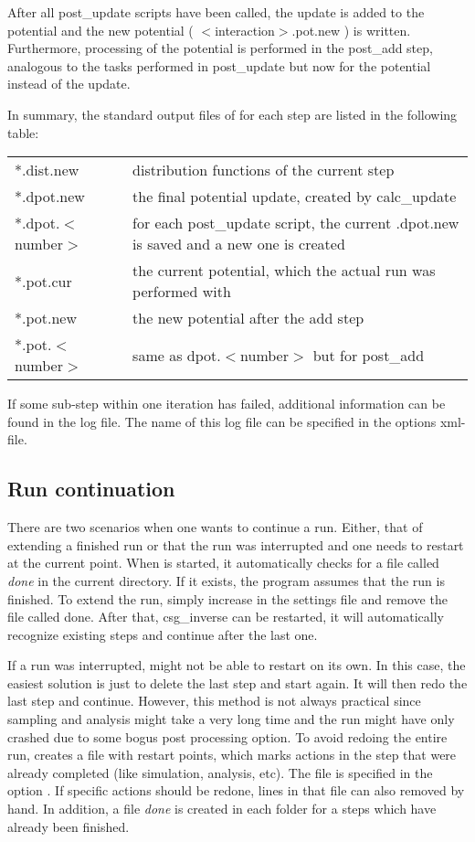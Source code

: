 After all post\_update scripts have been called, the update is added to the potential and the new potential ( $<$interaction$>$.pot.new ) is written. Furthermore, processing of the potential is performed in the post\_add step, analogous to the tasks performed in post\_update but now for the potential instead of the update.

In summary, the standard output files of \votca for each step are listed in the following table:

\begin{tabular}{ll}
*.dist.new & distribution functions of the current step \\
*.dpot.new & the final potential update, created by calc\_update \\
*.dpot.$<$number$>$ & for each post\_update script, the current .dpot.new is saved and a new one is created\\
*.pot.cur & the current potential, which the actual run was performed with \\
*.pot.new & the new potential after the add step \\
*.pot.$<$number$>$ & same as dpot.$<$number$>$ but for post\_add
\end{tabular}

If some sub-step within one iteration has failed, additional information can be found in the log file. The name of this log file can be specified in the options xml-file.

\subsection{Run continuation}
There are two scenarios when one wants to continue a run. Either, that of extending a finished run or that the run was interrupted and one needs to restart at the current point. When  is started, it automatically checks for a file called \textit{done} in the current directory. If it exists, the program assumes that the run is finished. To extend the run, simply increase  in the settings file and remove the file called done. After that, csg\_inverse can be restarted, it will automatically recognize existing steps and continue after the last one.

If a run was interrupted,  might not be able to restart on its own. In this case, the easiest solution is just to delete the last step and start again. It will then redo the last step and continue. However, this method is not always practical since sampling and analysis might take a very long time and the run might have only crashed due to some bogus post processing option. To avoid redoing the entire run,  creates a file with restart points, which marks actions in the step that were already completed (like simulation, analysis, etc). The file is specified in the option . If specific actions should be redone, lines in that file can also removed by hand. In addition, a file \textit{done} is created in each folder for a steps which have already been finished.

